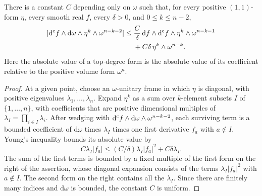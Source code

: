 \begin{lemma}\label{lem:pointwise-torsion-estimate}
There is a constant $C$ depending only on $\omega$ such that, for every positive $(1,1)$-form $\eta$, every smooth real $f$, every $\delta>0$, and $0\leq k\leq n-2$,
\[
 \begin{split}
 |\mathrm d^{\mathrm c} f\wedge \mathrm{d}\omega\wedge\eta^k\wedge\omega^{n-k-2}|
 \leq{}&\frac C\delta\,\mathrm{d}f\wedge\mathrm d^{\mathrm c} f\wedge\eta^k\wedge\omega^{n-k-1}\\
 &+C\delta\,\eta^k\wedge\omega^{n-k}.
 \end{split}
\]
Here the absolute value of a top-degree form is the absolute value of its coefficient relative to the positive volume form $\omega^n$.
\end{lemma}
\begin{proof}
At a given point, choose an $\omega$-unitary frame in which $\eta$ is diagonal, with positive eigenvalues $\lambda_1,\ldots,\lambda_n$. Expand $\eta^k$ as a sum over $k$-element subsets $I$ of $\{1,\ldots,n\}$, with coefficients that are positive dimensional multiples of $\lambda_I=\prod_{i\in I}\lambda_i$. After wedging with $\mathrm d^{\mathrm c} f\wedge \mathrm{d}\omega\wedge\omega^{n-k-2}$, each surviving term is a bounded coefficient of $\mathrm{d}\omega$ times $\lambda_I$ times one first derivative $f_a$ with $a\notin I$. Young's inequality bounds its absolute value by
\[
 C\lambda_I|f_a|\leq (C/\delta)\lambda_I|f_a|^2
                              +C\delta\lambda_I.
\]
The sum of the first terms is bounded by a fixed multiple of the first form on the right of the assertion, whose diagonal expansion consists of the terms $\lambda_I|f_a|^2$ with $a\notin I$. The second form on the right contains all the $\lambda_I$. Since there are finitely many indices and $\mathrm{d}\omega$ is bounded, the constant $C$ is uniform.
\end{proof}

